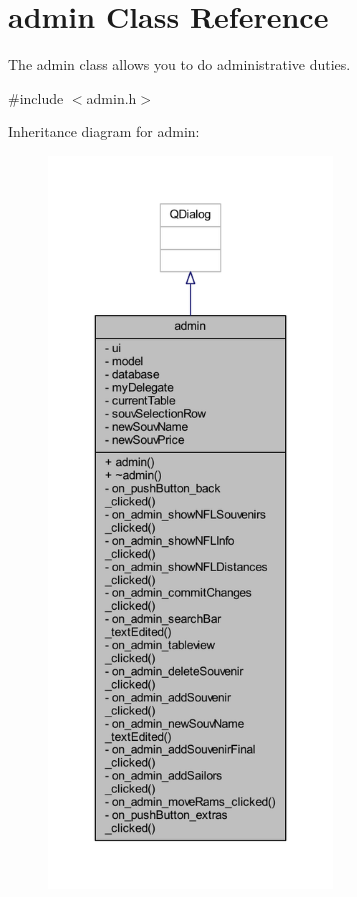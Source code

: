 \hypertarget{classadmin}{}\section{admin Class Reference}
\label{classadmin}


The admin class allows you to do administrative duties.  




{\ttfamily \#include $<$admin.\+h$>$}



Inheritance diagram for admin\+:
\nopagebreak
\begin{figure}[H]
\begin{center}
\leavevmode
\includegraphics[height=550pt]{classadmin__inherit__graph}
\end{center}
\end{figure}


